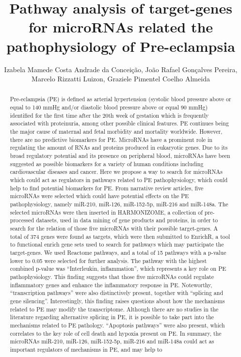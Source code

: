 \documentclass[twoside]{article}
\title{\vspace{-15mm}\fontsize{24pt}{10pt}\selectfont\textbf{ Pathway analysis of target-genes for microRNAs related the pathophysiology of Pre-eclampsia }} %
\author{ Izabela Mamede Costa Andrade da Concei\c{c}\~ao,  Jo\~ao Rafael Gon\c{c}alves Pereira,  Marcelo Rizzatti Luizon,  Graziele Pimentel Coelho Almeida }
\affil{ UNIVERSIDADE FEDERAL DE MINAS GERAIS,  UFMG }
\date{}
\begin{document}
  
  
  \maketitle %
  
  
  \thispagestyle{fancy} %
  
  
  \begin{abstract}
  Pre-eclampsia (PE) is defined as arterial hypertension (systolic blood pressure above or equal to 140 mmHg and/or diastolic blood pressure above or equal 90 mmHg) identified for the first time after the 20th week of gestation which is frequently associated with proteinuria,  among other possible clinical features. PE continues being the major cause of maternal and fetal morbidity and mortality worldwide. However,  there are no predictive biomarkers for PE. MicroRNAs have a prominent role in regulating the amount of RNAs and proteins produced in eukaryotic genes. Due to its broad regulatory potential and its presence on peripheral blood,  microRNAs have been suggested as possible biomarkers for a variety of human conditions including cardiovascular diseases and cancer. Here we propose a way to search for microRNAs which could act as regulators in pathways related to PE pathophysiology,  which could help to find potential biomarkers for PE. From narrative review articles,  five microRNAs were selected which could have potential effects on the PE pathophysiology,  namely miR-210,  miR-126,  miR-152-5p,  miR-216 and miR-148a. The selected microRNAs were then inserted in HARMONIZOME,  a collection of pre-processed datasets,  used in data mining of gene products and proteins,  in order to search for the relation of those five microRNAs with their possible target-genes. A total of 374 genes were found as targets,  which were then submitted to EnrichR,  a tool to functional enrich gene sets used to search for pathways which may participate the target-genes. We used Reactome pathways,  and a total of 15 pathways with a p-value lower to 0.05 were selected for further analysis. The pathway with the highest combined p-value was “Interleukin,  inflammation”,  which represents a key role on PE pathophysiology. This finding suggests that those five microRNAs could regulate inflammatory genes and enhance the inflammatory response in PE. Noteworthy,  “transcription pathways” were also distinctively present,  together with “splicing and gene silencing”. Interestingly,  this finding raises questions about how the mechanisms related to PE may modify the transcriptome. Although there are no studies in the literature regarding alternative splicing in PE,  it is possible to take part into the mechanisms related to PE pathology. “Apoptosis pathways” were also present,  which correlates to the key role of cell death and hypoxia present on PE. In summary,  the microRNAs miR-210,  miR-126,  miR-152-5p,  miR-216 and miR-148a could act as important regulators of mechanisms in PE,  and may help to 
\end{abstract}
\end{document}
